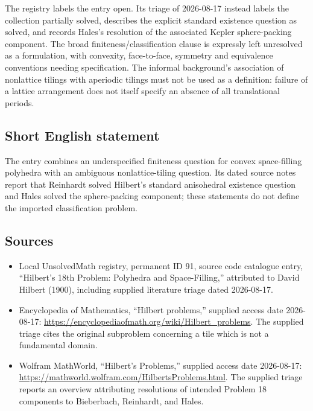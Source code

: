 \documentclass[11pt]{article}
\begin{document}
The registry labels the entry open. Its triage of 2026-08-17 instead labels the collection partially solved, describes the explicit standard existence question as solved, and records Hales's resolution of the associated Kepler sphere-packing component. The broad finiteness/classification clause is expressly left unresolved as a formulation, with convexity, face-to-face, symmetry and equivalence conventions needing specification. The informal background's association of nonlattice tilings with aperiodic tilings must not be used as a definition: failure of a lattice arrangement does not itself specify an absence of all translational periods.
\subsection{Short English statement}
The entry combines an underspecified finiteness question for convex space-filling polyhedra with an ambiguous nonlattice-tiling question. Its dated source notes report that Reinhardt solved Hilbert's standard anisohedral existence question and Hales solved the sphere-packing component; these statements do not define the imported classification problem.
\subsection{Sources}
\begin{itemize}
\item Local UnsolvedMath registry, permanent ID 91, source code catalogue entry, ``Hilbert's 18th Problem: Polyhedra and Space-Filling,'' attributed to David Hilbert (1900), including supplied literature triage dated 2026-08-17.
\item Encyclopedia of Mathematics, ``Hilbert problems,'' supplied access date 2026-08-17: \url{https://encyclopediaofmath.org/wiki/Hilbert_problems}. The supplied triage cites the original subproblem concerning a tile which is not a fundamental domain.
\item Wolfram MathWorld, ``Hilbert's Problems,'' supplied access date 2026-08-17: \url{https://mathworld.wolfram.com/HilbertsProblems.html}. The supplied triage reports an overview attributing resolutions of intended Problem 18 components to Bieberbach, Reinhardt, and Hales.
\end{itemize}
\end{document}
